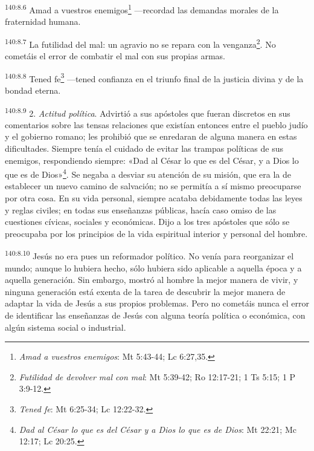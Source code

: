 \par 
\textsuperscript{140:8.6} Amad a vuestros enemigos\footnote{\textit{Amad a vuestros enemigos}: Mt 5:43-44; Lc 6:27,35.} ---recordad las demandas morales de la fraternidad humana.

\par 
\textsuperscript{140:8.7} La futilidad del mal: un agravio no se repara con la venganza\footnote{\textit{Futilidad de devolver mal con mal}: Mt 5:39-42; Ro 12:17-21; 1 Ts 5:15; 1 P 3:9-12.}. No cometáis el error de combatir el mal con sus propias armas.

\par 
\textsuperscript{140:8.8} Tened fe\footnote{\textit{Tened fe}: Mt 6:25-34; Lc 12:22-32.} ---tened confianza en el triunfo final de la justicia divina y de la bondad eterna.

\par 
\textsuperscript{140:8.9} 2. \textit{Actitud política}. Advirtió a sus apóstoles que fueran discretos en sus comentarios sobre las tensas relaciones que existían entonces entre el pueblo judío y el gobierno romano; les prohibió que se enredaran de alguna manera en estas dificultades. Siempre tenía el cuidado de evitar las trampas políticas de sus enemigos, respondiendo siempre: «Dad al César lo que es del César, y a Dios lo que es de Dios»\footnote{\textit{Dad al César lo que es del César y a Dios lo que es de Dios}: Mt 22:21; Mc 12:17; Lc 20:25.}. Se negaba a desviar su atención de su misión, que era la de establecer un nuevo camino de salvación; no se permitía a sí mismo preocuparse por otra cosa. En su vida personal, siempre acataba debidamente todas las leyes y reglas civiles; en todas sus enseñanzas públicas, hacía caso omiso de las cuestiones cívicas, sociales y económicas. Dijo a los tres apóstoles que sólo se preocupaba por los principios de la vida espiritual interior y personal del hombre.

\par 
\textsuperscript{140:8.10} Jesús no era pues un reformador político. No venía para reorganizar el mundo; aunque lo hubiera hecho, sólo hubiera sido aplicable a aquella época y a aquella generación. Sin embargo, mostró al hombre la mejor manera de vivir, y ninguna generación está exenta de la tarea de descubrir la mejor manera de adaptar la vida de Jesús a sus propios problemas. Pero no cometáis nunca el error de identificar las enseñanzas de Jesús con alguna teoría política o económica, con algún sistema social o industrial.

